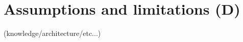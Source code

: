 \section{Assumptions and limitations (D)}
\label{sec:assumptions-limitations}
(knowledge/architecture/etc...)
